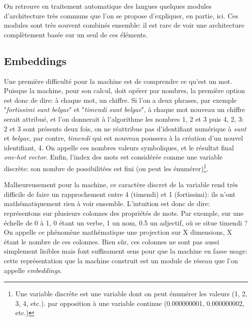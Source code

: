 On retrouve en traitement automatique des langues quelques modules d'architecture très communs que l'on se propose d'expliquer, en partie, ici. Ces modules sont très souvent combinés ensemble: il est rare de voir une architecture complètement basée sur un seul de ces éléments.

\subsection{Embeddings}
\label{deep-learning:embeddings}

Une première difficulté pour la machine est de comprendre ce qu'est un mot. Puisque la machine, pour son calcul, doit opérer par nombres, la première option est donc de dire: à chaque mot, un chiffre. Si l'on a deux phrases, par exemple "\textit{fortissimi sunt belgae}" et "\textit{timendi sunt belgae}", à chaque mot nouveau un chiffre serait attribué, et l'on donnerait à l'algorithme les nombres 1, 2 et 3 puis 4, 2, 3: 2 et 3 sont présents deux fois, on ne réattribue pas d'identifiant numérique à \textit{sunt} et \textit{belgae}, par contre, \textit{timendi} qui est nouveau poussera à la création d'un nouvel identifiant, 4. On appelle ces nombres valeurs symboliques, et le résultat final \textit{one-hot vector}. Enfin, l'index des mots est considérée comme une variable discrète: son nombre de possibilitées est fini (on peut les énumérer)\footnote{Une variable discrète est une variable dont on peut énumérer les valeurs (1, 2, 3, 4, etc.). par opposition à une variable continue (0.000000001, 0.000000002, etc.)}. 

Malheureusement pour la machine, ce caractère discret de la variable rend très difficile de faire un rapprochement entre 4 (timendi) et 1 (fortissimi): ils n'ont mathématiquement rien à voir ensemble. L'intuition est donc de dire: représentons sur plusieurs colonnes des propriétés de mots. Par exemple, sur une échelle de 0 à 1, 0 étant un verbe, 1 un nom, 0.5 un adjectif, où se situe timendi ? On appelle ce phénomène mathématique une projection sur X dimensions, X étant le nombre de ces colonnes. Bien sûr, ces colonnes ne sont pas aussi simplement lisibles mais font suffisament sens pour que la machine en fasse usage: cette représentation que la machine construit est un module de réseau que l'on appelle \textit{embeddings}. 

